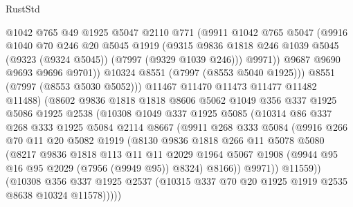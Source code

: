 \begin{lexlean}{RustStd}
\begin{coremodule}
{\begin{coremodule}
{{{{{{{{{{{{{{{{{{{{{{{{{{{{{{{{{{{{{{{{{{{                  @1042
                  @765
                  @49
                  @1925
                  @5047
                  @2110
                  @771
                  (@9911
                    @1042
                    @765
                    @5047
                    (@9916
                      @1040
                      @70
                      @246
                      @20
                      @5045
                      @1919
                      (@9315
                        @9836
                        @1818
                        @246
                        @1039
                        @5045
                        (@9323 (@9324 @5045))
                        (@7997 (@9329 @1039 @246)))
                      @9971))
                  @9687
                  @9690
                  @9693
                  @9696
                  @9701))
              @10324
              @8551
              (@7997 (@8553 @5040 @1925)))
            @8551
            (@7997 (@8553 @5030 @5052)))
          @11467
          @11470
          @11473
          @11477
          @11482
          @11488)
        (@8602
          @9836
          @1818
          @1818
          @8606
          @5062
          @1049
          @356
          @337
          @1925
          @5086
          @1925
          @2538
          (@10308
            @1049
            @337
            @1925
            @5085
            (@10314
              @86
              @337
              @268
              @333
              @1925
              @5084
              @2114
              @8667
              (@9911
                @268
                @333
                @5084
                (@9916
                  @266
                  @70
                  @11
                  @20
                  @5082
                  @1919
                  (@8130
                    @9836
                    @1818
                    @266
                    @11
                    @5078
                    @5080
                    (@8217
                      @9836
                      @1818
                      @113
                      @11
                      @11
                      @2029
                      @1964
                      @5067
                      @1908
                      (@9944 @95 @16 @95 @2029 (@7956 (@9949 @95)) @8324)
                      @8166))
                  @9971))
              @11559))
          (@10308
            @356
            @337
            @1925
            @2537
            (@10315 @337 @70 @20 @1925 @1919 @2535 @8638 @10324 @11578)))))
}}}}}}}}}}}}}}}}}}}}}}}}}}}}}}}}}}}}}}}}}}}
\end{coremodule}}
\end{coremodule}
\end{lexlean}

